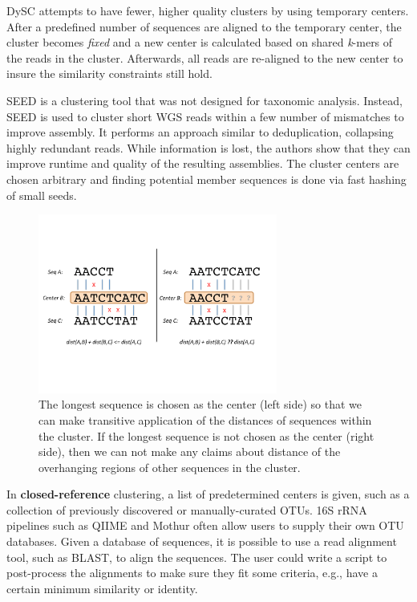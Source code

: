 DySC\cite{zheng_dysc:_2012} attempts to have fewer, higher quality clusters by using temporary centers.
After a predefined number of sequences are aligned to the temporary center, the cluster becomes \emph{fixed} and a new center is calculated based on shared \emph{k}-mers of the reads in the cluster.
Afterwards, all reads are re-aligned to the new center to insure the similarity constraints still hold.

SEED\cite{bao_seed:_2011} is a clustering tool that was not designed for taxonomic analysis. Instead, SEED is used to cluster short WGS reads within a few number of mismatches to improve assembly.  It performs an approach similar to deduplication, collapsing highly redundant reads.  While information is lost, the authors show that they can improve runtime and quality of the resulting assemblies. The cluster centers are chosen arbitrary and finding potential member sequences is done via fast hashing of small seeds.



\begin{figure}[tb!]
  \centering
    \includegraphics[width=0.7\textwidth]{overlap}
  \caption{The longest sequence is chosen as the center (left side) so that we can make transitive application of the distances of sequences within the cluster.  If the longest sequence is not chosen as the center (right side), then we can not make any claims about distance of the overhanging regions of other sequences in the cluster.}
  \label{fig:overlap}
\end{figure}



In {\bf closed-reference} clustering, a list of predetermined centers is given, such as a collection of previously discovered or manually-curated OTUs\cite{desantis_greengenes_2006,quast_silva_2013}.
16S rRNA pipelines such as QIIME\cite{caporaso_qiime_2010} and Mothur\cite{schloss_introducing_2009} often allow users to supply their own OTU databases.
Given a database of sequences, it is possible to use a read alignment tool, such as BLAST\cite{altschul_gapped_1997}, to align the sequences.
The user could write a script to post-process the alignments to make sure they fit some criteria, e.g., have a certain minimum similarity or identity.

